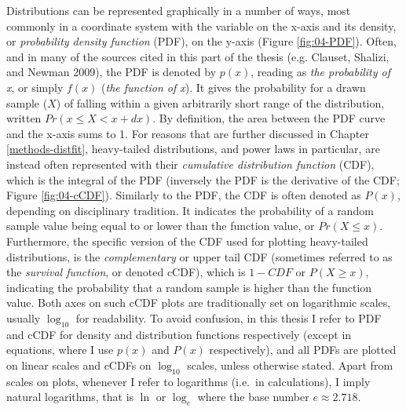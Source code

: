 \documentclass[
  12pt,
  a4paper, twoside]{book}
\begin{document}
Distributions can be represented graphically in a number of ways, most commonly in a coordinate system with the variable on the x-axis and its density, or \emph{probability density function} (PDF), on the y-axis (Figure \ref{fig:04-PDF}). Often, and in many of the sources cited in this part of the thesis (e.g. Clauset, Shalizi, and Newman 2009), the PDF is denoted by \(p(x)\), reading as \emph{the probability of x}, or simply \(f(x)\) (\emph{the function of x}). It gives the probability for a drawn sample (\(X\)) of falling within a given arbitrarily short range of the distribution, written \(Pr(x \le X < x+dx)\). By definition, the area between the PDF curve and the x-axis sums to 1. For reasons that are further discussed in Chapter \ref{methods-distfit}, heavy-tailed distributions, and power laws in particular, are instead often represented with their \emph{cumulative distribution function} (CDF), which is the integral of the PDF (inversely the PDF is the derivative of the CDF; Figure \ref{fig:04-cCDF}). Similarly to the PDF, the CDF is often denoted as \(P(x)\), depending on disciplinary tradition. It indicates the probability of a random sample value being equal to or lower than the function value, or \(Pr(X \le x)\). Furthermore, the specific version of the CDF used for plotting heavy-tailed distributions, is the \emph{complementary} or upper tail CDF (sometimes referred to as the \emph{survival function}, or denoted cCDF), which is \(1-CDF\) or \(P(X \ge x)\), indicating the probability that a random sample is higher than the function value. Both axes on such cCDF plots are traditionally set on logarithmic scales, usually \(\log_{10}\) for readability. To avoid confusion, in this thesis I refer to PDF and cCDF for density and distribution functions respectively (except in equations, where I use \(p(x)\) and \(P(x)\) respectively), and all PDFs are plotted on linear scales and cCDFs on \(\log_{10}\) scales, unless otherwise stated. Apart from scales on plots, whenever I refer to logarithms (i.e.~in calculations), I imply natural logarithms, that is \(\ln\) or \(\log_e\) where the base number \(e \approx 2.718\).
\end{document}
